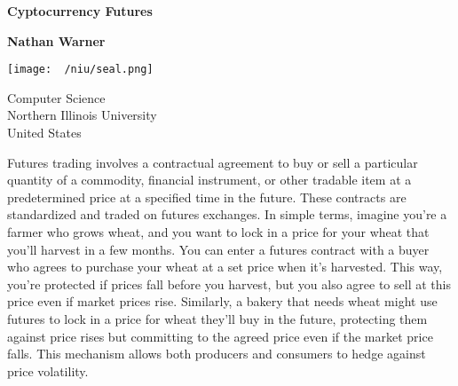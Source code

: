 \documentclass{report}
\title{\Huge{}}
\author{\huge{Nathan Warner}}
\date{\huge{}}
\begin{document}
        \begin{titlepage}
       \begin{center}
           \vspace*{1cm}
    
           \textbf{Cyptocurrency Futures}
    
           \vspace{0.5cm}
            
                
           \vspace{1.5cm}
    
           \textbf{Nathan Warner}
    
           \vfill
                
                
           \vspace{0.8cm}
         
           \texttt{[image: ~/niu/seal.png]}
                
           Computer Science \\
           Northern Illinois University\\
           United States\\
           
                
       \end{center}
    \end{titlepage}
    \tableofcontents
    \pagebreak 
    \bigbreak \noindent 
    \begin{concept}
        Futures trading involves a contractual agreement to buy or sell a particular quantity of a commodity, financial instrument, or other tradable item at a predetermined price at a specified time in the future. These contracts are standardized and traded on futures exchanges.
        \bigbreak \noindent 
        In simple terms, imagine you're a farmer who grows wheat, and you want to lock in a price for your wheat that you'll harvest in a few months. You can enter a futures contract with a buyer who agrees to purchase your wheat at a set price when it's harvested. This way, you're protected if prices fall before you harvest, but you also agree to sell at this price even if market prices rise. Similarly, a bakery that needs wheat might use futures to lock in a price for wheat they'll buy in the future, protecting them against price rises but committing to the agreed price even if the market price falls. This mechanism allows both producers and consumers to hedge against price volatility.
    \end{concept}
\end{document}
